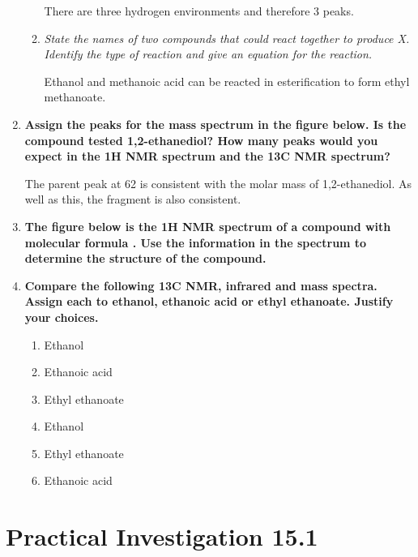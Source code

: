 \documentclass{report}
\begin{document}
\begin{enumerate}
\begin{enumerate}
					There are three hydrogen environments and therefore 3 peaks.

				\item \textit{State the names of two compounds that could react together to produce X. Identify the type of reaction and give an equation for the reaction.}

					Ethanol and methanoic acid can be reacted in esterification to form ethyl methanoate.
			\end{enumerate}

		\item \textbf{Assign the peaks for the mass spectrum in the figure below. Is the compound tested 1,2-ethanediol? How many peaks would you expect in the 1H NMR spectrum and the 13C NMR spectrum?}

			The parent peak at 62 is consistent with the molar mass of 1,2-ethanediol. As well as this, the fragment  is also consistent.

		\item \textbf{The figure below is the 1H NMR spectrum of a compound with molecular formula . Use the information in the spectrum to determine the structure of the compound.}

			\begin{center}
			\end{center}

		\item \textbf{Compare the following 13C NMR, infrared and mass spectra. Assign each to ethanol, ethanoic acid or ethyl ethanoate. Justify your choices.}

			\begin{enumerate}
				\item Ethanol
				\item Ethanoic acid
				\item Ethyl ethanoate
				\item Ethanol
				\item Ethyl ethanoate
				\item Ethanoic acid
			\end{enumerate}
	\end{enumerate}

\newpage

\section*{Practical Investigation 15.1}
\end{document}
